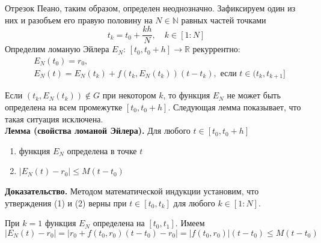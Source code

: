 \documentclass{article}
\begin{document}
Отрезок Пеано, таким образом, определен неоднозначно. Зафиксируем один из них и разобъем его правую половину на $N \in \mathbb{N}$ равных частей точками
\begin{equation*}
    t_k = t_0 + \frac{kh}{N}, \quad k \in [1 : N]
\end{equation*}
Определим ломаную Эйлера $E_N$: $[t_0, t_0 + h] \to \mathbb{R}$ рекуррентно:
\begin{equation}
    \begin{aligned}
        &E_N(t_0) = r_0,\\
        &E_N(t) = E_N(t_k) + f(t_k, E_N(t_k))(t - t_k), \text{ если } t \in (t_k, t_{k+1}]
        \label{eulerlom}
    \end{aligned}
\end{equation}

Если $(t_k, E_N(t_k)) \notin G$ при некотором $k$, то функция $E_N$ не может быть определена на всем промежутке $[t_0, t_0 + h]$. Следующая лемма показывает, что такая ситуация исключена.\\

\noindent \textbf{Лемма (свойства ломаной Эйлера).} Для любого $t \in [t_0, t_0 + h]$
\begin{enumerate}
    \item функция $E_N$ определена в точке $t$
    \item $|E_N(t) - r_0| \le M(t - t_0)$
\end{enumerate}
\textbf{Доказательство.} Методом математической индукции установим, что утверждения (1) и (2) верны при $t \in [t_0, t_k]$ для любого $k \in [1 : N]$.

При $k = 1$ функция $E_N$ определена на $[t_0, t_1]$. Имеем
\begin{equation*}
    |E_N(t) - r_0| = |r_0 + f(t_0, r_0)(t - t_0) - r_0| = |f(t_0, r_0)|(t - t_0) \le M(t - t_0)
\end{equation*}
\begin{figure}[h!]\label{peano}
\end{figure}
\end{document}
